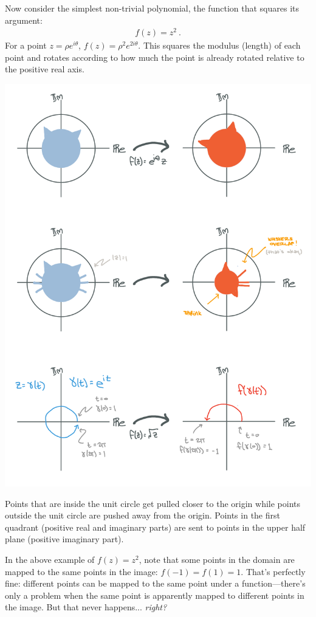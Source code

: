 \begin{example}
Now consider the simplest non-trivial polynomial, the function that squares its argument:
\begin{align}
	f(z) =  z^2 \ .
\end{align}
For a point $z = \rho e^{i\theta}$, $f(z)  = \rho^2 e^{2i\theta}$. This squares the modulus (length) of each point and rotates according to how much the point is already rotated relative to the positive real axis.
\begin{center}
\includegraphics[width=.7\textwidth]{figures/Complex_03_sq.pdf}
\end{center}
Points that are inside the unit circle get pulled closer to the origin while points outside the unit circle are pushed away from the origin.  Points in the first quadrant (positive real and imaginary parts) are sent to points in the upper half plane (positive imaginary part).
\end{example}

In the above example of $f(z)= z^2$, note that some points in the domain are mapped to the same points in the image: $f(-1) = f(1) = 1$. That's perfectly fine: different points can be mapped to the same point under a function---there's only a problem when the same point is apparently mapped to different points in the image. But that never happens... \emph{right?}

